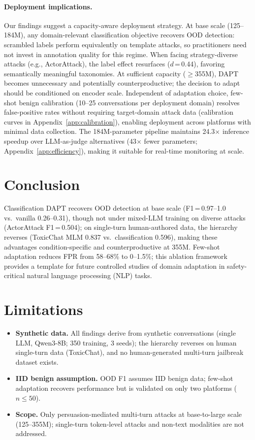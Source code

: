 \paragraph{Deployment implications.}
Our findings suggest a capacity-aware deployment strategy. At base scale (125--184M), any domain-relevant classification objective recovers OOD detection: scrambled labels perform equivalently on template attacks, so practitioners need not invest in annotation quality for this regime. When facing strategy-diverse attacks (e.g., ActorAttack), the label effect resurfaces ($d$\,=\,0.44), favoring semantically meaningful taxonomies. At sufficient capacity ($\geq$355M), DAPT becomes unnecessary and potentially counterproductive; the decision to adapt should be conditioned on encoder scale. Independent of adaptation choice, few-shot benign calibration (10--25 conversations per deployment domain) resolves false-positive rates without requiring target-domain attack data (calibration curves in Appendix~\ref{app:calibration}), enabling deployment across platforms with minimal data collection. The 184M-parameter pipeline maintains 24.3$\times$ inference speedup over LLM-as-judge alternatives (43$\times$ fewer parameters; Appendix~\ref{app:efficiency}), making it suitable for real-time monitoring at scale.

\section{Conclusion}

Classification DAPT recovers OOD detection at base scale (F1\,=\,0.97--1.0 vs.\ vanilla 0.26--0.31), though not under mixed-LLM training on diverse attacks (ActorAttack F1\,=\,0.504); on single-turn human-authored data, the hierarchy reverses (ToxicChat MLM 0.837 vs.\ classification 0.596), making these advantages condition-specific and counterproductive at 355M. Few-shot adaptation reduces FPR from 58--68\% to 0--1.5\%; this ablation framework provides a template for future controlled studies of domain adaptation in safety-critical natural language processing (NLP) tasks.

\section*{Limitations}
\label{sec:limitations}

\begin{itemize}[nosep,leftmargin=*]
\item \textbf{Synthetic data.} All findings derive from synthetic conversations (single LLM, Qwen3-8B; 350 training, 3 seeds); the hierarchy reverses on human single-turn data (ToxicChat), and no human-generated multi-turn jailbreak dataset exists.
\item \textbf{IID benign assumption.} OOD F1 assumes IID benign data; few-shot adaptation recovers performance but is validated on only two platforms ($n \leq 50$).
\item \textbf{Scope.} Only persuasion-mediated multi-turn attacks at base-to-large scale (125--355M); single-turn token-level attacks and non-text modalities are not addressed.
\end{itemize}

